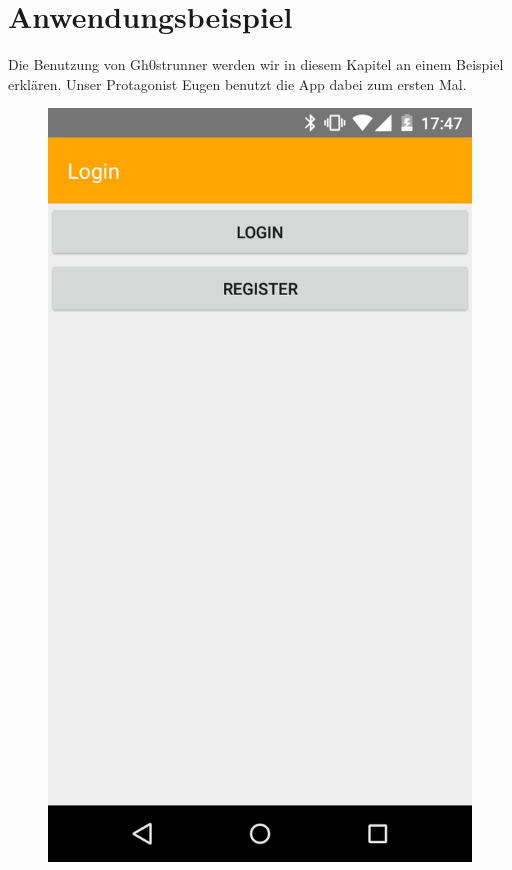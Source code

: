 \section{Anwendungsbeispiel}\label{kapitel8}
Die Benutzung von Gh0strunner werden wir in diesem Kapitel an einem Beispiel erklären. Unser Protagonist Eugen benutzt die App dabei zum ersten Mal.

\begin{figure}[!h]
\centering
\begin{minipage}{.4\textwidth}
  \centering
  \includegraphics[width=.8\linewidth]{abb/bsp/bsp1}
  \label{fig:bsp1}
\end{minipage}
\begin{minipage}{.4\textwidth}
  \centering

\end{minipage}
\end{figure}
